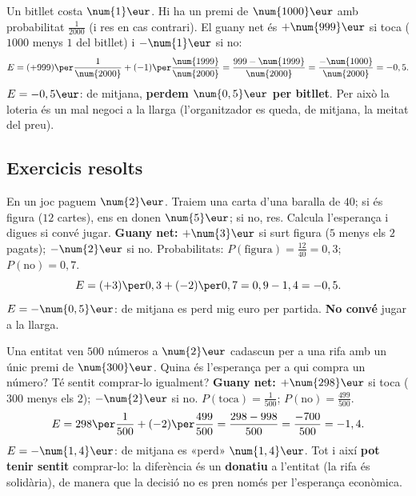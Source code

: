 \begin{exemple}
Un bitllet costa $\num{1}\eur$. Hi ha un premi de $\num{1000}\eur$ amb probabilitat
$\frac{1}{\num{2000}}$ (i res en cas contrari). El guany net és $+\num{999}\eur$ si toca
($\num{1000}$ menys $\num{1}$ del bitllet) i $-\num{1}\eur$ si no:
\[
E = (+999)\per\frac{1}{\num{2000}} + (-1)\per\frac{\num{1999}}{\num{2000}}
= \frac{999-\num{1999}}{\num{2000}}=\frac{-\num{1000}}{\num{2000}}=-0,5.
\]
$E=-0,5\eur$: de mitjana, \textbf{perdem $\num{0,5}\eur$ per bitllet}. Per això la
loteria és un mal negoci a la llarga (l'organitzador es queda, de mitjana, la meitat del
preu).
\end{exemple}

\subsection{Exercicis resolts}

\begin{exresolt}
En un joc paguem $\num{2}\eur$. Traiem una carta d'una baralla de $40$; si és figura
($12$ cartes), ens en donen $\num{5}\eur$; si no, res. Calcula l'esperança i digues si
convé jugar.
\solucio
\textbf{Guany net:} $+\num{3}\eur$ si surt figura ($5$ menys els $2$ pagats);
$-\num{2}\eur$ si no. Probabilitats: $P(\text{figura})=\frac{12}{40}=0,3$;
$P(\text{no})=0,7$.
\[
E = (+3)\per 0,3 + (-2)\per 0,7 = 0,9 - 1,4 = -0,5.
\]
$E=-\num{0,5}\eur$: de mitjana es perd mig euro per partida. \textbf{No convé} jugar a
la llarga.
\end{exresolt}

\begin{exresolt}
Una entitat ven $\num{500}$ números a $\num{2}\eur$ cadascun per a una rifa amb un únic
premi de $\num{300}\eur$. Quina és l'esperança per a qui compra un número? Té sentit
comprar-lo igualment?
\solucio
\textbf{Guany net:} $+\num{298}\eur$ si toca ($300$ menys els $2$); $-\num{2}\eur$ si no.
$P(\text{toca})=\frac{1}{500}$; $P(\text{no})=\frac{499}{500}$.
\[
E = 298\per\frac{1}{500} + (-2)\per\frac{499}{500}
= \frac{298-998}{500}=\frac{-700}{500}=-1,4.
\]
$E=-\num{1,4}\eur$: de mitjana es «perd» $\num{1,4}\eur$. Tot i així \textbf{pot tenir
sentit} comprar-lo: la diferència és un \textbf{donatiu} a l'entitat (la rifa és
solidària), de manera que la decisió no es pren només per l'esperança econòmica.
\end{exresolt}

